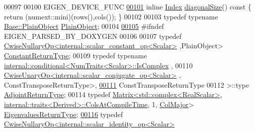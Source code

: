 \begin{DoxyCode}
00097 
00100     EIGEN\_DEVICE\_FUNC
\hyperlink{group___core___module_a3bcb5338f3ba8a1a5609bd1802a9bc95}{00101}     \textcolor{keyword}{inline} \hyperlink{namespace_eigen_a62e77e0933482dafde8fe197d9a2cfde}{Index} \hyperlink{group___core___module_a3bcb5338f3ba8a1a5609bd1802a9bc95}{diagonalSize}()\textcolor{keyword}{ const }\{ \textcolor{keywordflow}{return} (numext::mini)(rows(),cols()); \}
00102 
00103     \textcolor{keyword}{typedef} \textcolor{keyword}{typename} \hyperlink{group___core___module_aae45af9b5aca5a9caae98fd201f47cc4}{Base::PlainObject} \hyperlink{class_eigen_1_1internal_1_1_tensor_lazy_evaluator_writable}{PlainObject};
00104 
\hyperlink{group___core___module_aef908389c90ade88aafefd7e8f7b024e}{00105} \textcolor{preprocessor}{#ifndef EIGEN\_PARSED\_BY\_DOXYGEN}
00106 
00107     \textcolor{keyword}{typedef} \hyperlink{group___core___module_class_eigen_1_1_cwise_nullary_op}{CwiseNullaryOp<internal::scalar\_constant\_op<Scalar>}
      ,PlainObject> \hyperlink{group___core___module_class_eigen_1_1_cwise_nullary_op}{ConstantReturnType};
00109     \textcolor{keyword}{typedef} \textcolor{keyword}{typename} \hyperlink{struct_eigen_1_1internal_1_1conditional}{internal::conditional<NumTraits<Scalar>::IsComplex}
      ,
00110                         \hyperlink{group___core___module_class_eigen_1_1_cwise_unary_op}{CwiseUnaryOp<internal::scalar\_conjugate\_op<Scalar>}
      , ConstTransposeReturnType>,
\hyperlink{group___core___module_aa93be3d50d662b7bb54bfd346e480675}{00111}                         ConstTransposeReturnType
00112                      >::type \hyperlink{class_eigen_1_1internal_1_1_tensor_lazy_evaluator_writable}{AdjointReturnType};
00114     \textcolor{keyword}{typedef} \hyperlink{group___core___module_class_eigen_1_1_matrix}{Matrix<std::complex<RealScalar>}, 
      \hyperlink{struct_eigen_1_1internal_1_1traits}{internal::traits<Derived>::ColsAtCompileTime}, 1, 
      \hyperlink{group__enums_ggaacded1a18ae58b0f554751f6cdf9eb13a0cbd4bdd0abcfc0224c5fcb5e4f6669a}{ColMajor}> \hyperlink{group___core___module_class_eigen_1_1_matrix}{EigenvaluesReturnType};
\hyperlink{group___core___module_aaf3ed6d9cad060b3e5685b3839271706}{00116}     \textcolor{keyword}{typedef} \hyperlink{group___core___module_class_eigen_1_1_cwise_nullary_op}{CwiseNullaryOp<internal::scalar\_identity\_op<Scalar>}

\end{DoxyCode}
